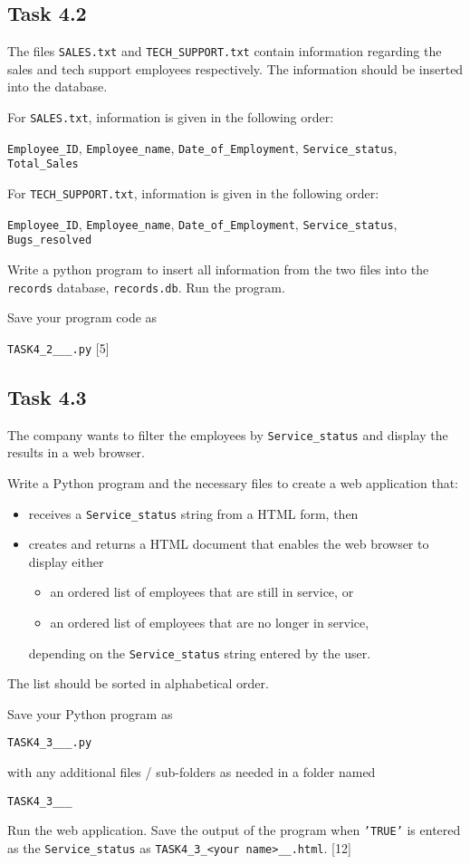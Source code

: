\subsection*{Task 4.2 }

The files \texttt{SALES.txt} and \texttt{TECH\_SUPPORT.txt} contain
information regarding the sales and tech support employees respectively.
The information should be inserted into the database.

For \texttt{SALES.txt}, information is given in the following order: 

\texttt{Employee\_ID}, \texttt{Employee\_name}, \texttt{Date\_of\_Employment},
\texttt{Service\_status}, \texttt{Total\_Sales}

For \texttt{TECH\_SUPPORT.txt}, information is given in the following
order: 

\texttt{Employee\_ID}, \texttt{Employee\_name}, \texttt{Date\_of\_Employment},
\texttt{Service\_status}, \texttt{Bugs\_resolved}

Write a python program to insert all information from the two files
into the \texttt{records} database, \texttt{records.db}. Run the program.

Save your program code as 

\texttt{TASK4\_2\_<your name>\_<centre number>\_<index number>.py}\hfill{}
{[}5{]}

\subsection*{Task 4.3}

The company wants to filter the employees by \texttt{Service\_status}
and display the results in a web browser.

Write a Python program and the necessary files to create a web application
that:
\begin{itemize}
\item receives a \texttt{Service\_status} string from a HTML form, then
\item creates and returns a HTML document that enables the web browser to
display either
\begin{itemize}
\item an ordered list of employees that are still in service, or 
\item an ordered list of employees that are no longer in service,
\end{itemize}
depending on the \texttt{Service\_status} string entered by the user.
\end{itemize}
The list should be sorted in alphabetical order.

Save your Python program as 

\texttt{TASK4\_3\_<your name>\_<centre number>\_<index number>.py }

with any additional files / sub-folders as needed in a folder named 

\texttt{TASK4\_3\_<your name>\_<centre number>\_<index number>}

Run the web application. Save the output of the program when \texttt{'TRUE'}
is entered as the \texttt{Service\_status} as \texttt{TASK4\_3\_<your
name>\_<centre number>\_<index number>.html}. \hfill{}{[}12{]}
